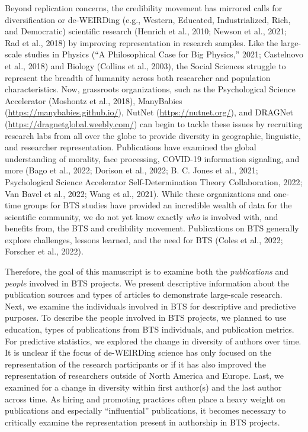 \documentclass[
  man,mask,floatsintext]{apa7}
\begin{document}
Beyond replication concerns, the credibility movement has mirrored calls for diversification or de-WEIRDing (e.g., Western, Educated, Industrialized,
Rich, and Democratic) scientific research (Henrich et al., 2010; Newson et al., 2021; Rad et al., 2018) by improving representation in research samples. Like the
large-scale studies in Physics ({``A Philosophical Case for Big Physics,''} 2021; Castelnovo et al., 2018) and
Biology (Collins et al., 2003), the Social Sciences struggle to represent the
breadth of humanity across both researcher and population
characteristics. Now, grassroots organizations, such as the
Psychological Science Accelerator (Moshontz et al., 2018), ManyBabies
(\url{https://manybabies.github.io/}), NutNet (\url{https://nutnet.org/}), and
DRAGNet (\url{https://dragnetglobal.weebly.com/}) can begin to tackle these
issues by recruiting research labs from all over the globe to provide
diversity in geographic, linguistic, and researcher representation.
Publications have examined the global understanding of morality, face
processing, COVID-19 information signaling, and more (Bago et al., 2022; Dorison et al., 2022; B. C. Jones et al., 2021; Psychological Science Accelerator Self-Determination Theory Collaboration, 2022; Van Bavel et al., 2022; Wang et al., 2021). While these organizations and one-time groups
for BTS studies have provided an incredible wealth of data for the
scientific community, we do not yet know exactly \emph{who} is involved with,
and benefits from, the BTS and credibility movement. Publications on BTS
generally explore challenges, lessons learned, and the need for BTS
(Coles et al., 2022; Forscher et al., 2022).

Therefore, the goal of this manuscript is to examine both the \emph{publications} and \emph{people} involved in BTS projects. We present descriptive information about the publication sources and types of articles to demonstrate large-scale research. Next, we examine the individuals involved in BTS for descriptive and predictive purposes. To describe the people involved in BTS projects, we planned to use education, types of publications from BTS individuals, and publication metrics. For predictive statistics, we explored the change in diversity of authors over time. It is unclear if the focus of de-WEIRDing science has only focused on the representation of the
research participants or if it has also improved the representation of
researchers outside of North America and Europe. Last, we examined for a change in diversity within first author(s) and the last author across time. As hiring and promoting practices often place a heavy weight on publications and especially ``influential'' publications, it becomes necessary to critically examine the representation present in authorship in BTS projects.
\end{document}
